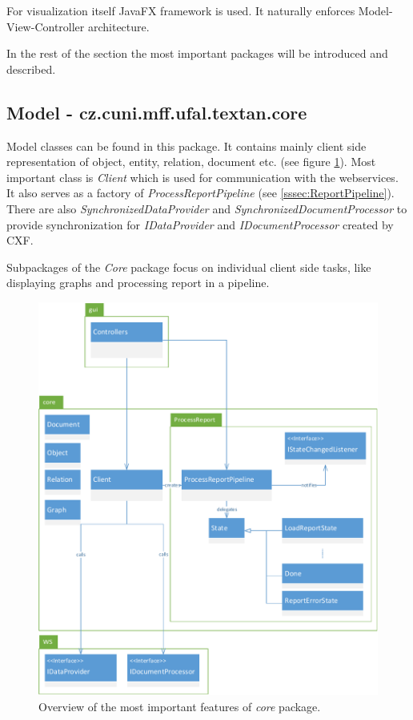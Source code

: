 For visualization itself JavaFX framework is used. It naturally enforces
Model-View-Controller architecture.

In the rest of the section the most important packages will be introduced and
described.

\subsection{Model - cz.cuni.mff.ufal.textan.core}

Model classes can be found in this package. It contains mainly client side
representation of object, entity, relation, document etc. (see figure \ref{fig:CorePackage}). Most important class
is \emph{Client} which is used for communication with the webservices. It also
serves as a factory of \emph{ProcessReportPipeline} (see
\ref{sssec:ReportPipeline}). There are also \emph{SynchronizedDataProvider} and
\emph{SynchronizedDocumentProcessor} to provide synchronization for
\emph{IDataProvider} and \emph{IDocumentProcessor} created by CXF.

Subpackages of the \emph{Core} package focus on individual client side tasks,
like displaying graphs and processing report in a pipeline.

\begin{figure}[!htb]
        \centering
        \includegraphics[width=\textwidth]{Images/CorePackage}
        \caption{Overview of the most important features of \emph{core} package.}
        \label{fig:CorePackage}
\end{figure}

